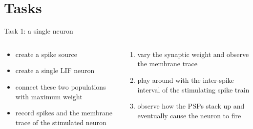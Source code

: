 \documentclass[aspectratio=169]{beamer}
\begin{document}
\section{Tasks}

\begin{frame}{Task 1: a single neuron}
	\begin{columns}[onlytextwidth]
		\begin{column}{0.48\textwidth}
			\begin{center}
			\end{center}

			\begin{itemize}
				\item create a spike source
				\item create a single LIF neuron
				\item connect these two populations with maximum weight
				\item record spikes and the membrane trace of the stimulated neuron
			\end{itemize}
		\end{column}
		\hfill
		\begin{column}{0.48\textwidth}
			\begin{enumerate}
				\item vary the synaptic weight and observe the membrane trace
				\item play around with the inter-spike interval of the stimulating spike train
				\item observe how the PSPs stack up and eventually cause the neuron to fire
			\end{enumerate}
		\end{column}
	\end{columns}
\end{frame}
\end{document}
